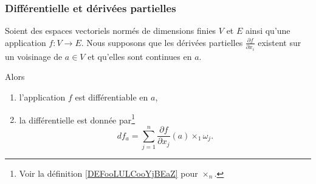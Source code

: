 \subsubsection{Différentielle et dérivées partielles}

\begin{proposition}     \label{PROPooUDJLooHwzjQF}
	Soient des espaces vectoriels normés de dimensions finies \( V\) et \( E\) ainsi qu'une application \( f\colon V\to E\). Nous supposons que les dérivées partielles \( \frac{ \partial f }{ \partial x_i }\) existent sur un voisinage de \( a\in V\) et qu'elles sont continues en \( a\).

	Alors
	\begin{enumerate}
		\item
		      l'application \( f\) est différentiable en \( a\),
		\item
            la différentielle est donnée par\footnote{Voir la définition \ref{DEFooLULCooYjBEaZ} pour \( \times_n\).}
		      \begin{equation}
			      df_a=\sum_{j=1}^n\frac{ \partial f }{ \partial x_j }(a)\times_1\omega_j.
		      \end{equation}
	\end{enumerate}
\end{proposition}


